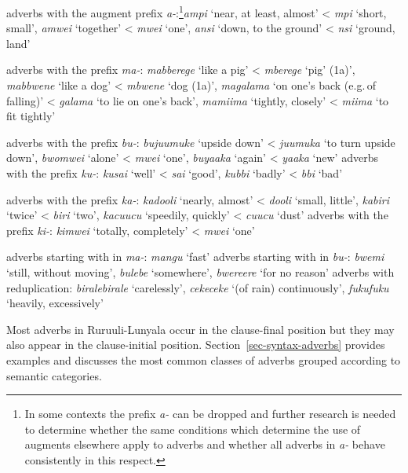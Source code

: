 \ea  \label{ex-adv-derivation}
\begin{xlist}

\ex adverbs with the augment prefix \textit{a-}:\footnote{In some contexts the prefix \textit{a-} can be dropped and further research is needed to determine whether the same conditions which determine the use of augments elsewhere apply to adverbs and whether all adverbs in \textit{a-} behave consistently in this respect.}\textit{ampi} `near, at least, almost' < \textit{mpi} `short, small', \textit{amwei} `together' < \textit{mwei} `one', \textit{ansi} `down, to the ground' < \textit{nsi} `ground, land'

\ex adverbs with the prefix \textit{ma-}: \textit{mabberege} `like a pig' < \textit{mberege} `pig' (1a)', \textit{mabbwene} `like a dog' < \textit{mbwene} `dog (1a)', \textit{magalama} `on one’s back (e.g.\,of falling)' < \textit{galama} `to lie on one's back', \textit{mamiima} `tightly, closely' < \textit{miima} `to fit tightly'  \label{ex-adv-ma}

\ex adverbs with the prefix \textit{bu-}: \textit{bujuumuke} `upside down' < \textit{juumuka}	 `to turn upside down', 
\textit{bwomwei} `alone' < \textit{mwei} `one', \textit{buyaaka} `again' < \textit{yaaka} `new'
\ex  adverbs with the prefix \textit{ku-}: \textit{kusai} `well' < \textit{sai} `good', \textit{kubbi} `badly' < \textit{bbi} `bad'

\ex adverbs with the prefix \textit{ka-}: \textit{kadooli} `nearly, almost' < \textit{dooli} `small, little', \textit{kabiri} `twice' < \textit{biri} `two', \textit{kacuucu} `speedily, quickly' < \textit{cuucu} `dust' 
\ex adverbs with the prefix \textit{ki-}: \textit{kimwei} `totally, completely' < \textit{mwei} `one'
\end{xlist}
\z

\ea  \label{ex-adv-unclear-derivation}
\begin{xlist}
\ex adverbs starting with in \textit{ma-}: \textit{mangu} `fast'
\ex adverbs starting with in \textit{bu-}: \textit{bwemi} `still, without moving', \textit{bulebe} `somewhere', \textit{bwereere} `for no reason'
\ex adverbs with reduplication: \textit{biralebirale} `carelessly', \textit{cekeceke} `(of rain) continuously', \textit{fukufuku} `heavily, excessively'
\end{xlist}
\z

Most adverbs in Ru\-ruu\-li\hyp{}Lu\-nya\-la occur in the clause-final position but they may also appear in the clause-initial position. 
Section~\ref{sec-syntax-adverbs} provides examples and discusses the most common classes of adverbs grouped according to semantic categories. 


